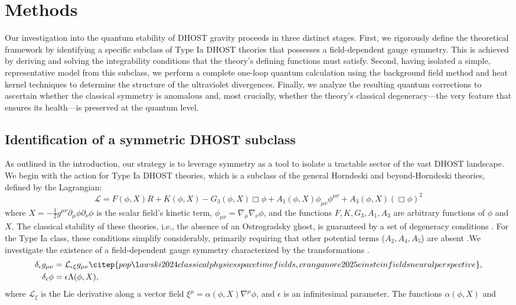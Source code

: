 \documentclass[twocolumn]{aastex631}
\begin{document}
\section{Methods}
\label{sec:methods}
Our investigation into the quantum stability of DHOST gravity proceeds in three distinct stages. First, we rigorously define the theoretical framework by identifying a specific subclass of Type Ia DHOST theories that possesses a field-dependent gauge symmetry. This is achieved by deriving and solving the integrability conditions that the theory's defining functions must satisfy. Second, having isolated a simple, representative model from this subclass, we perform a complete one-loop quantum calculation using the background field method and heat kernel techniques to determine the structure of the ultraviolet divergences. Finally, we analyze the resulting quantum corrections to ascertain whether the classical symmetry is anomalous and, most crucially, whether the theory's classical degeneracy---the very feature that ensures its health---is preserved at the quantum level.\subsection{Identification of a symmetric DHOST subclass}As outlined in the introduction, our strategy is to leverage symmetry as a tool to isolate a tractable sector of the vast DHOST landscape. We begin with the action for Type Ia DHOST theories, which is a subclass of the general Horndeski and beyond-Horndeski theories, defined by the Lagrangian:\begin{equation}\mathcal{L} = F(\phi, X) R + K(\phi, X) - G_3(\phi, X) \Box\phi + A_1(\phi, X) \phi_{\mu\nu}\phi^{\mu\nu} + A_3(\phi, X) (\Box\phi)^2\end{equation}where $X = - \frac{1}{2} g^{\mu\nu} \partial_\mu \phi \partial_\nu \phi$ is the scalar field's kinetic term, $\phi_{\mu\nu} = \nabla_\mu \nabla_\nu \phi$, and the functions $F, K, G_3, A_1, A_3$ are arbitrary functions of $\phi$ and $X$. The classical stability of these theories, i.e., the absence of an Ostrogradsky ghost, is guaranteed by a set of degeneracy conditions \citep{crisostomi2017higherderivativefieldtheories,crisostomi2017higherderivativefieldtheories}. For the Type Ia class, these conditions simplify considerably, primarily requiring that other potential terms ($A_2, A_4, A_5$) are absent \citep{nezhad2025degeneratehigherorderscalartensortheories}.We investigate the existence of a field-dependent gauge symmetry characterized by the transformations \citep{banerjee2000quantumgaugesymmetryfinite,upadhyay2012fielddependentnilpotentsymmetry,upadhyay2013finitefielddependentsymmetriesperturbative}.\begin{align}\delta_\epsilon g_{\mu\nu} &= \mathcal{L}_{\epsilon \xi} g_{\mu\nu} \citep{popławski2024classicalphysicsspacetimefields,cranganore2025einsteinfieldsneuralperspective}, \\\delta_\epsilon \phi &= \epsilon \Lambda(\phi, X),\end{align}where $\mathcal{L}_{\xi}$ is the Lie derivative along a vector field $\xi^\mu = \alpha(\phi, X) \nabla^\mu \phi$, and $\epsilon$ is an infinitesimal parameter. The functions $\alpha(\phi, X)$ and 
\end{document}
